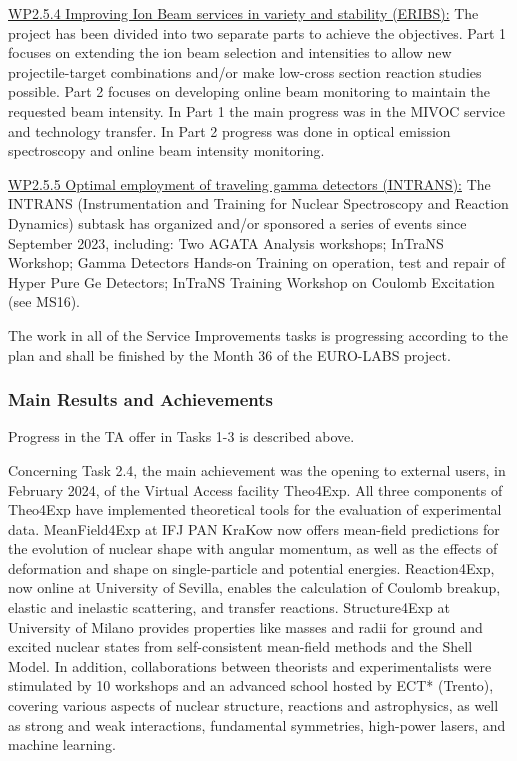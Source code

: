 \underline{WP2.5.4 Improving Ion Beam services in variety and stability (ERIBS):} The project has been divided into two separate parts to achieve the objectives. Part 1 focuses on extending the ion beam selection and intensities to allow new projectile-target combinations and/or make low-cross section reaction studies possible. Part 2 focuses on developing online beam monitoring to maintain the requested beam intensity. In Part 1 the main progress was in the MIVOC service and technology transfer. In Part 2 progress was done in optical emission spectroscopy and online beam intensity monitoring.

\underline{WP2.5.5 Optimal employment of traveling gamma detectors (INTRANS):} The INTRANS (Instrumentation and Training for Nuclear Spectroscopy and Reaction Dynamics) subtask has organized and/or sponsored a series of events since September 2023, including: Two AGATA Analysis workshops; InTraNS Workshop; Gamma Detectors Hands-on Training on operation, test and repair of Hyper Pure Ge Detectors; InTraNS Training Workshop on Coulomb Excitation (see MS16). 

The work in all of the Service Improvements tasks is progressing according to the plan and shall be finished by the Month 36 of the EURO-LABS project.


\subsubsection*{Main Results and Achievements}


Progress in the TA offer in Tasks 1-3 is described above. 

Concerning Task 2.4, 
the main achievement was the opening to external users, in February 2024, of the Virtual Access facility Theo4Exp. All three components of Theo4Exp have implemented theoretical tools for the evaluation of experimental data. MeanField4Exp at IFJ PAN KraKow now offers mean-field predictions for the evolution of nuclear shape with angular momentum, as well as the effects of deformation and shape on single-particle and potential energies. Reaction4Exp, now online at University of Sevilla, enables the calculation of Coulomb breakup, elastic and inelastic scattering, and transfer reactions. Structure4Exp at University of Milano provides properties like masses and radii for ground and excited nuclear states from self-consistent mean-field methods and the Shell Model. In addition, collaborations between theorists and experimentalists were stimulated by 10 workshops and an advanced school hosted by ECT* (Trento), covering various aspects of nuclear structure, reactions and astrophysics, as well as strong and weak interactions, fundamental symmetries, high-power lasers, and machine learning.

